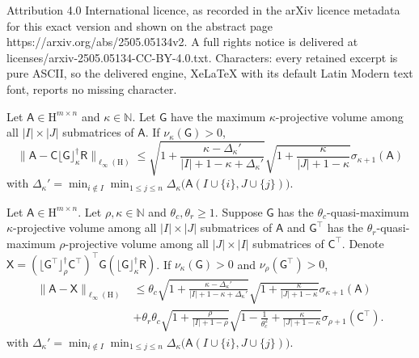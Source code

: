 \documentclass[10pt,a4paper]{amsart}
\newcommand{\Batrix}[1]{\bm{\Matrix{#1}}}
\newcommand{\Hilb}{\mathrm{H}}
\newcommand{\Index}[1]{{#1}}
\newcommand{\Matrix}[1]{\mathsf{#1}}
\newcommand{\Norm}[3][]{#1\| #2 #1\|_{\mathrm{#3}}}
\newcommand{\N}{\mathbb{N}}
\newcommand{\pinv}{\dagger}
\newcommand{\trans}{\intercal}
\newcommand{\truncate}[3][]{#1\lfloor #2 #1\rfloor_{#3}}
\begin{document}
Attribution 4.0 International licence, as recorded in the arXiv licence metadata for this exact version and shown on the abstract page https://arxiv.org/abs/2505.05134v2. A full rights notice is delivered at licenses/arxiv-2505.05134-CC-BY-4.0.txt. Characters: every retained excerpt is pure ASCII, so the delivered engine, XeLaTeX with its default Latin Modern text font, reports no missing character.
\begin{theorem}
\label{theorem:cgr_error_maxvol}
Let $\Batrix{A} \in \Hilb^{m \times n}$ and $\kappa \in \N$.
Let $\Batrix{G}$ have the maximum $\kappa$-projective volume among all $|\Index{I}| \times |\Index{J}|$ submatrices of $\Batrix{A}$.
If $\nu_{\kappa}(\Batrix{G}) > 0$,
\begin{equation*}
    \Norm{\Batrix{A} - \Batrix{C} \truncate{\Batrix{G}}{\kappa}^\pinv \Batrix{R}}{\ell_{\infty}(\Hilb)} \leq \sqrt{1 + \frac{\kappa - \Delta_\kappa'}{|\Index{I}| + 1 - \kappa + \Delta_\kappa'}} \sqrt{1 + \frac{\kappa}{|\Index{J}| + 1 - \kappa}} \sigma_{\kappa + 1}(\Batrix{A})
\end{equation*}
with $\Delta_\kappa' = \min_{i \not\in \Index{I}} \min_{1 \leq j \leq n} \Delta_{\kappa}\big( \Batrix{A}(\Index{I} \cup \{i\}, \Index{J} \cup \{j\}) \big)$.
\end{theorem}

\begin{theorem}
\label{theorem:cross_error_maxvol}
Let $\Batrix{A} \in \Hilb^{m \times n}$. 
Let $\rho,\kappa \in \N$ and $\theta_c, \theta_r \geq 1$.
Suppose $\Batrix{G}$ has the $\theta_c$-quasi-maximum $\kappa$-projective volume among all $|\Index{I}| \times |\Index{J}|$ submatrices of $\Batrix{A}$ and $\Batrix{G}^\trans$ has the $\theta_r$-quasi-maximum $\rho$-projective volume among all $|\Index{J}| \times |\Index{I}|$ submatrices of $\Batrix{C}^\trans$.
Denote $\Batrix{X} = (\truncate{\Batrix{G}^\trans}{\rho}^\pinv \Batrix{C}^\trans)^\trans \Batrix{G} (\truncate{\Batrix{G}}{\kappa}^\pinv \Batrix{R})$.
If $\nu_{\kappa}(\Batrix{G}) > 0$ and $\nu_{\rho}(\Batrix{G}^\trans) > 0$,
\begin{align*}
    \Norm{\Batrix{A} - \Batrix{X}}{\ell_{\infty}(\Hilb)} &\leq \theta_c \sqrt{1 + \frac{\kappa - \Delta_\kappa'}{|\Index{I}| + 1 - \kappa + \Delta_\kappa'}} \sqrt{1 + \frac{\kappa}{|\Index{J}| + 1 - \kappa}} \sigma_{\kappa + 1}(\Batrix{A}) \\
    &+ \theta_r \theta_c \sqrt{1 + \frac{\rho}{|\Index{I}| + 1 - \rho}} \sqrt{1 - \frac{1}{\theta_c^2} + \frac{\kappa}{|\Index{J}| + 1 - \kappa}} \sigma_{\rho + 1}(\Batrix{C}^\trans).
\end{align*}
with $\Delta_\kappa' = \min_{i \not\in \Index{I}} \min_{1 \leq j \leq n} \Delta_{\kappa}\big( \Batrix{A}(\Index{I} \cup \{i\}, \Index{J} \cup \{j\}) \big)$.
\end{theorem}
\end{document}
